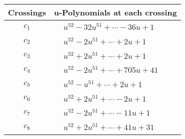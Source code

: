 \documentclass[1p]{elsarticle_modified}
\theoremstyle{definition}
\begin{document}
\begin{tabular}{m{50pt}|m{274pt}}
Crossings & \hspace{64pt}u-Polynomials at each crossing \\
\hline $$\begin{aligned}c_{1}\end{aligned}$$&$\begin{aligned}
&u^{52}-32 u^{51}+\cdots-36 u+1
\end{aligned}$\\
\hline $$\begin{aligned}c_{2}\end{aligned}$$&$\begin{aligned}
&u^{52}-2 u^{51}+\cdots+2 u+1
\end{aligned}$\\
\hline $$\begin{aligned}c_{3}\end{aligned}$$&$\begin{aligned}
&u^{52}+2 u^{51}+\cdots+2 u+1
\end{aligned}$\\
\hline $$\begin{aligned}c_{4}\end{aligned}$$&$\begin{aligned}
&u^{52}-2 u^{51}+\cdots+705 u+41
\end{aligned}$\\
\hline $$\begin{aligned}c_{5}\end{aligned}$$&$\begin{aligned}
&u^{52}- u^{51}+\cdots+2 u+1
\end{aligned}$\\
\hline $$\begin{aligned}c_{6}\end{aligned}$$&$\begin{aligned}
&u^{52}+2 u^{51}+\cdots-2 u+1
\end{aligned}$\\
\hline $$\begin{aligned}c_{7}\end{aligned}$$&$\begin{aligned}
&u^{52}-2 u^{51}+\cdots-11 u+1
\end{aligned}$\\
\hline $$\begin{aligned}c_{8}\end{aligned}$$&$\begin{aligned}
&u^{52}+2 u^{51}+\cdots+41 u+31
\end{aligned}$\\

\end{tabular}
\end{document}
